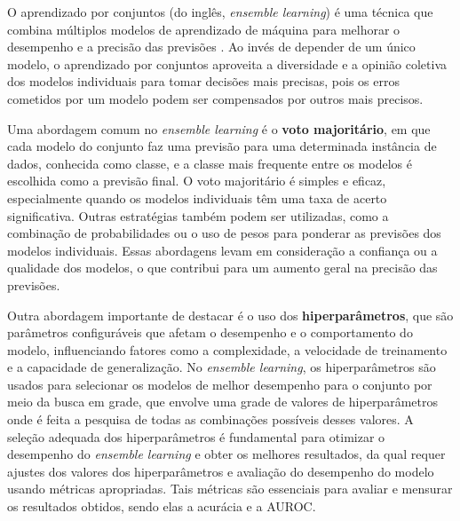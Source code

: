 
O aprendizado por conjuntos (do inglês, \textit{ensemble learning}) é uma técnica que combina múltiplos modelos de aprendizado de máquina para melhorar o desempenho e a precisão das previsões \cite{OPITZEnsemble}. Ao invés de depender de um único modelo, o aprendizado por conjuntos aproveita a diversidade e a opinião coletiva dos modelos individuais para tomar decisões mais precisas, pois os erros cometidos por um modelo podem ser compensados por outros mais precisos. 

Uma abordagem comum no \textit{ensemble learning} é o \textbf{voto majoritário}, em que cada modelo do conjunto faz uma previsão para uma determinada instância de dados, conhecida como classe, e a classe mais frequente entre os modelos é escolhida como a previsão final. O voto majoritário é simples e eficaz, especialmente quando os modelos individuais têm uma taxa de acerto significativa. Outras estratégias também podem ser utilizadas, como a combinação de probabilidades ou o uso de pesos para ponderar as previsões dos modelos individuais. Essas abordagens levam em consideração a confiança ou a qualidade dos modelos, o que contribui para um aumento geral na precisão das previsões.

Outra abordagem importante de destacar é o uso dos \textbf{hiperparâmetros}, que são parâmetros configuráveis que afetam o desempenho e o comportamento do modelo, influenciando fatores como a complexidade, a velocidade de treinamento e a capacidade de generalização. No \textit{ensemble learning}, os hiperparâmetros são usados para selecionar os modelos de melhor desempenho para o conjunto por meio da busca em grade, que envolve uma grade de valores de hiperparâmetros onde é feita a pesquisa de todas as combinações possíveis desses valores. A seleção adequada dos hiperparâmetros é fundamental para otimizar o desempenho do \textit{ensemble learning} e obter os melhores resultados, da qual requer ajustes dos valores dos hiperparâmetros e avaliação do desempenho do modelo usando métricas apropriadas. Tais métricas são essenciais para avaliar e mensurar os resultados obtidos, sendo elas a acurácia e a AUROC.


